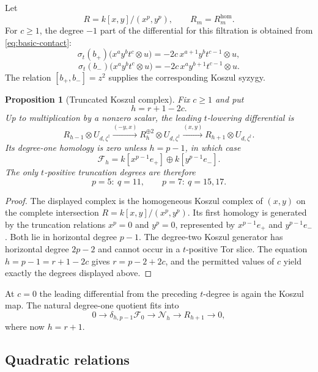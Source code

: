 \documentclass[11pt]{article}
\theoremstyle{plain}
\newtheorem{proposition}[proposition]{Proposition}
\theoremstyle{definition}
\theoremstyle{remark}
\numberwithin{equation}{section}
\newcommand{\kk}{k}
\begin{document}
Let
\[
 R=\kk[x,y]/(x^p,y^p),
 \qquad R_m=R_m^{\mathrm{hom}}.
\]
For $c\ge1$, the degree $-1$ part of the differential for this filtration is obtained from
\eqref{eq:basic-contact}:
\begin{equation}\label{eq:t-drop-action}
 \sigma_t(b_+)\bigl(x^ay^bt^c\otimes u\bigr)
 =-2c\,x^{a+1}y^bt^{c-1}\otimes u,
\end{equation}
\begin{equation}\label{eq:t-drop-action-minus}
 \sigma_t(b_-)\bigl(x^ay^bt^c\otimes u\bigr)
 =-2c\,x^ay^{b+1}t^{c-1}\otimes u.
\end{equation}
The relation $[b_+,b_-]=z^2$ supplies the corresponding Koszul syzygy.

\begin{proposition}[Truncated Koszul complex]\label{prop:Koszul}
Fix $c\ge1$ and put
\[
 h=r+1-2c.
\]
Up to multiplication by a nonzero scalar, the leading $t$-lowering differential is
\[
 R_{h-1}\otimes U_{d,\zeta^\dagger}
 \xrightarrow{(-y,x)}
 R_h^{\oplus2}\otimes U_{d,\zeta^\dagger}
 \xrightarrow{(x,y)}
 R_{h+1}\otimes U_{d,\zeta^\dagger}.
\]
Its degree-one homology is zero unless $h=p-1$, in which case
\[
 \mathscr F_h
 =\kk[x^{p-1}e_+]\oplus\kk[y^{p-1}e_-].
\]
The only $t$-positive truncation degrees are therefore
\[
 p=5:\ q=11,
 \qquad
 p=7:\ q=15,17.
\]
\end{proposition}

\begin{proof}
The displayed complex is the homogeneous Koszul complex of $(x,y)$ on the complete
intersection $R=\kk[x,y]/(x^p,y^p)$.  Its first homology is generated by the truncation
relations $x^p=0$ and $y^p=0$, represented by $x^{p-1}e_+$ and $y^{p-1}e_-$.  Both lie in
horizontal degree $p-1$.  The degree-two Koszul generator has horizontal degree $2p-2$ and
cannot occur in a $t$-positive Tor slice.  The equation $h=p-1=r+1-2c$ gives
$r=p-2+2c$, and the permitted values of $c$ yield exactly the degrees displayed above.
\end{proof}

At $c=0$ the leading differential from the preceding $t$-degree is again the Koszul map.
The natural degree-one quotient fits into
\begin{equation}\label{eq:bottom-koszul}
 0\longrightarrow\delta_{h,p-1}\mathscr F_0
 \longrightarrow\mathscr N_h
 \longrightarrow R_{h+1}\longrightarrow0,
\end{equation}
where now $h=r+1$.

\subsection{Quadratic relations}\label{sec:quadratic}
\end{document}
